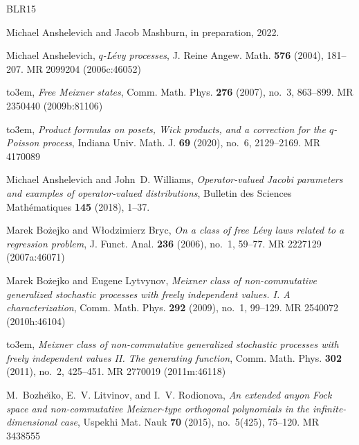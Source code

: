 \documentclass[12pt]{amsart}
\theoremstyle{definition}
\begin{document}
\def\cprime{$'$} \def\cprime{$'$}
\providecommand{\bysame}{\leavevmode\hbox to3em{\hrulefill}\thinspace}
\providecommand{\MR}{\relax\ifhmode\unskip\space\fi MR }
\providecommand{\MRhref}[2]{%
  \href{http://www.ams.org/mathscinet-getitem?mr=#1}{#2}
}
\providecommand{\href}[2]{#2}
\begin{thebibliography}{BLR15}

Michael Anshelevich and Jacob Mashburn, in preparation, 2022.

Michael Anshelevich, \emph{{$q$}-{L}\'evy processes}, J. Reine Angew. Math.
  \textbf{576} (2004), 181--207. \MR{2099204 (2006c:46052)}

\bysame, \emph{Free {M}eixner states}, Comm. Math. Phys. \textbf{276} (2007),
  no.~3, 863--899. \MR{2350440 (2009b:81106)}

\bysame, \emph{Product formulas on posets, {W}ick products, and a correction
  for the {$q$}-{P}oisson process}, Indiana Univ. Math. J. \textbf{69} (2020),
  no.~6, 2129--2169. \MR{4170089}

Michael Anshelevich and John~D. Williams, \emph{Operator-valued {J}acobi
  parameters and examples of operator-valued distributions}, Bulletin des
  Sciences Math{\'e}matiques \textbf{145} (2018), 1--37.

Marek Bo{\.z}ejko and W{\l}odzimierz Bryc, \emph{On a class of free {L}\'evy
  laws related to a regression problem}, J. Funct. Anal. \textbf{236} (2006),
  no.~1, 59--77. \MR{2227129 (2007a:46071)}

Marek Bo{\.z}ejko and Eugene Lytvynov, \emph{Meixner class of non-commutative
  generalized stochastic processes with freely independent values. {I}. {A}
  characterization}, Comm. Math. Phys. \textbf{292} (2009), no.~1, 99--129.
  \MR{2540072 (2010h:46104)}

\bysame, \emph{Meixner class of non-commutative generalized stochastic
  processes with freely independent values {II}. {T}he generating function},
  Comm. Math. Phys. \textbf{302} (2011), no.~2, 425--451. \MR{2770019
  (2011m:46118)}

M.~Bozhe{\u\i}ko, E.~V. Litvinov, and I.~V. Rodionova, \emph{An extended anyon
  {F}ock space and non-commutative {M}eixner-type orthogonal polynomials in the
  infinite-dimensional case}, Uspekhi Mat. Nauk \textbf{70} (2015), no.~5(425),
  75--120. \MR{3438555}


\end{thebibliography}
\end{document}
